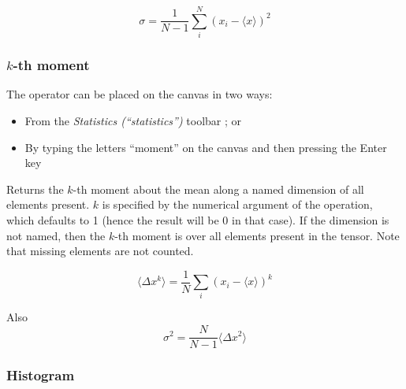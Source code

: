 \[
\sigma=\frac{1}{N-1}\sum_{i}^{N}(x_{i}-\langle x\rangle)^{2}
\]


\subsubsection{$k$-th moment}

\label{Operation:moment}


The operator can be placed on the canvas in two ways:
\begin{itemize}
\item From the \emph{Statistics (``statistics'')} toolbar ;
or 
\item By typing the letters ``moment'' on the canvas and then pressing the
Enter key
\end{itemize}
Returns the $k$-th moment about the mean along a named dimension
of all elements present. $k$ is specified by the numerical argument
of the operation, which defaults to 1 (hence the result will be 0
in that case). If the dimension is not named, then the $k$-th moment
is over all elements present in the tensor. Note that missing elements
are not counted.

\[
\langle\Delta x^{k}\rangle=\frac{1}{N}\sum_{i}(x_{i}-\langle x\rangle)^{k}
\]

Also 
\[
\sigma^{2}=\frac{N}{N-1}\langle\Delta x^{2}\rangle
\]


\subsubsection{Histogram}

\label{Operation:histogram}


